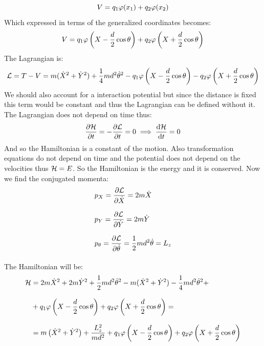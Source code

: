 \begin{equation}
  V = q_1\varphi(x_1) + q_2\varphi(x_2)
\end{equation}
Which expressed in terms of the generalized coordinates becomes:
\begin{equation}
  V = q_1\varphi \left(X - \dfrac{d}{2}\cos\theta\right) + q_2\varphi \left(X + \dfrac{d}{2}\cos\theta\right)
\end{equation}
The Lagrangian is:
\begin{equation}
  \mathcal{L} = T - V = m(\dot{X}^2+\dot{Y}^2) + \dfrac{1}{4}md^2\dot{\theta}^2 - q_1\varphi \left(X - \dfrac{d}{2}\cos\theta\right) - q_2\varphi \left(X + \dfrac{d}{2}\cos\theta\right)
\end{equation}
We should also account for a interaction potential but since the distance is fixed this term would be constant and thus the Lagrangian can be defined without it. The Lagrangian does not depend on time thus:
\begin{equation}
  \pdv{\hamfun}{t} = - \pdv{\lagr}{t} = 0 \implies \dv{\hamfun}{t} = 0
\end{equation}
And so the Hamiltonian is a constant of the motion. Also transformation equations do not depend on time and the potential does not depend on the velocities thus $\mathcal{H} = E$. So the Hamiltonian is the energy and it is conserved. Now we find the conjugated momenta:
\begin{equation}
  \begin{split}
    &p_X = \pdv{\lagr}{\dot{X}} = 2m\dot{X} \\[8pt]
    &p_Y = \pdv{\lagr}{\dot{Y}} = 2m\dot{Y} \\[8pt]
    &p_\theta = \pdv{\lagr}{\dot{\theta}} = \dfrac{1}{2}md^2\dot{\theta} = L_z \\[8pt]
  \end{split}
\end{equation}
The Hamiltonian will be:
\begin{equation}
  \begin{split}
    \mathcal{H} &= 2m\dot{X}^2 + 2m\dot{Y}^2+ \dfrac{1}{2}md^2\dot{\theta}^2 - m(\dot{X}^2+\dot{Y}^2) - \dfrac{1}{4}md^2\dot{\theta}^2 + \\[8pt]
    &+ q_1\varphi \left(X - \dfrac{d}{2}\cos\theta\right) + q_2\varphi \left(X + \dfrac{d}{2}\cos\theta\right) = \\[8pt]
    &= m\left(\dot{X}^2 + \dot{Y}^2\right) + \dfrac{L_z^2}{md^2} + q_1\varphi \left(X - \dfrac{d}{2}\cos\theta\right) + q_2\varphi \left(X + \dfrac{d}{2}\cos\theta\right)
  \end{split}
\end{equation}

